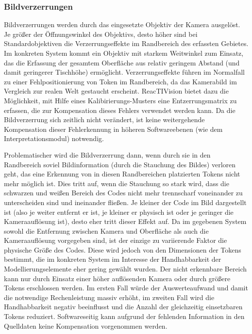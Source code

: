 
\subsubsection{Bildverzerrungen} %
\label{ssub:bildverzerrungen}

Bildverzerrungen werden durch das eingesetzte Objektiv der Kamera ausgelöst. Je größer der Öffnungswinkel des Objektivs, desto höher sind bei Standardobjektiven die Verzerrungseffekte im Randbereich des erfassten Gebietes. Im konkreten System kommt ein Objektiv mit starkem Weitwinkel zum Einsatz, das die Erfassung der gesamtem Oberfläche aus relativ geringem Abstand (und damit geringerer Tischhöhe) ermöglicht. Verzerrungseffekte führen im Normalfall zu einer Fehlpositionierung von Token im Randbereich, da das Kamerabild im Vergleich zur realen Welt gestaucht erscheint. ReacTIVision bietet dazu die Möglichkeit, mit Hilfe eines Kalibirierungs-Musters eine Entzerrungsmatrix zu erfassen, die zur Kompensation dieses Fehlers verwendet werden kann. Da die Bildverzerrung sich zeitlich nicht verändert, ist keine weitergehende Kompensation dieser Fehlerkennung in höheren Softwareebenen (wie dem Interpretationsmodul) notwendig.

Problematischer wird die Bildverzerrung dann, wenn durch sie in den Randbereich soviel Bildinformation (durch die Stauchung des Bildes) verloren geht, das eine Erkennung von in diesen Randbereichen platzierten Tokens nicht mehr möglich ist. Dies tritt auf, wenn die Stauchung so stark wird, dass die schwarzen und weißen Bereich des Codes nicht mehr trennscharf voneinander zu unterscheiden sind und ineinander fließen. Je kleiner der Code im Bild dargestellt ist (also je weiter entfernt er ist, je kleiner er physisch ist oder je geringer die Kameraauflösung ist), desto eher tritt dieser Effekt auf. Da im gegebenen System sowohl die Entfernung zwischen Kamera und Oberfläche als auch die Kameraauflösung vorgegeben sind, ist der einzige zu variierende Faktor die physische Größe des Codes. Diese wird jedoch von den Dimensionen der Tokens bestimmt, die im konkreten System im Interesse der Handhabbarkeit der Modellierungselemente eher gering gewählt wurden. Der nicht erkennbare Bereich kann nur durch Einsatz einer höher auflösenden Kamera oder durch größere Tokens erschlossen werden. Im ersten Fall würde der Auswerteaufwand und damit die notwendige Rechenleistung massiv erhöht, im zweiten Fall wird die Handhabbarkeit negativ beeinflusst und die Anzahl der gleichzeitig einsetzbaren Tokens reduziert. Softwareseitig kann aufgrund der fehlenden Information in den Quelldaten keine Kompensation vorgenommen werden.

